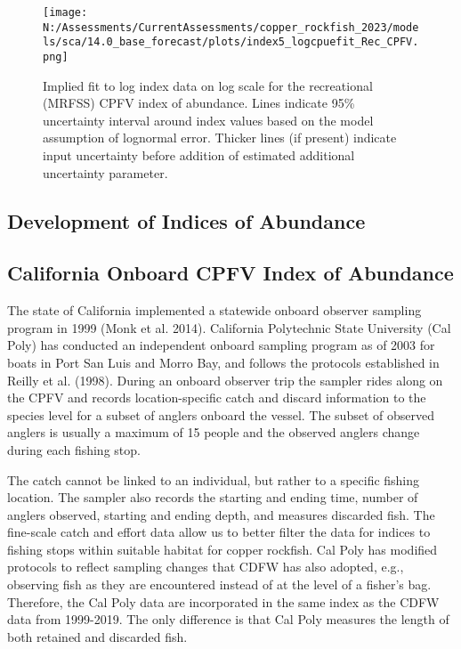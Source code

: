 \documentclass[11pt,
  english,
  letterpaper,
]{article}
\begin{document}
\begin{figure}
\centering
\texttt{[image: N:/Assessments/CurrentAssessments/copper\_rockfish\_2023/models/sca/14.0\_base\_forecast/plots/index5\_logcpuefit\_Rec\_CPFV.png]}
\caption{Implied fit to log index data on log scale for the recreational (MRFSS) CPFV index of abundance. Lines indicate 95\% uncertainty interval around index values based on the model assumption of lognormal error. Thicker lines (if present) indicate input uncertainty before addition of estimated additional uncertainty parameter.\label{fig:mrfss-cpfv-index-fit}}
\end{figure}

\pagebreak

\hypertarget{development-of-indices-of-abundance}{%
\subsection{Development of Indices of Abundance}\label{development-of-indices-of-abundance}}

\hypertarget{onboard-cpfv-index}{%
\subsection{California Onboard CPFV Index of Abundance}\label{onboard-cpfv-index}}

The state of California implemented a statewide onboard observer sampling program in 1999 (Monk et al. 2014). California Polytechnic State University (Cal Poly) has conducted an independent onboard sampling program as of 2003 for boats in Port San Luis and Morro Bay, and follows the protocols established in Reilly et al. (1998). During an onboard observer trip the sampler rides along on the CPFV and records location-specific catch and discard information to the species level for a subset of anglers onboard the vessel. The subset of observed anglers is usually a maximum of 15 people and the observed anglers change during each fishing stop.

The catch cannot be linked to an individual, but rather to a specific fishing location. The sampler also records the starting and ending time, number of anglers observed, starting and ending depth, and measures discarded fish. The fine-scale catch and effort data allow us to better filter the data for indices to fishing stops within suitable habitat for copper rockfish. Cal Poly has modified protocols to reflect sampling changes that CDFW has also adopted, e.g., observing fish as they are encountered instead of at the level of a fisher's bag. Therefore, the Cal Poly data are incorporated in the same index as the CDFW data from 1999-2019. The only difference is that Cal Poly measures the length of both retained and discarded fish.
\end{document}
